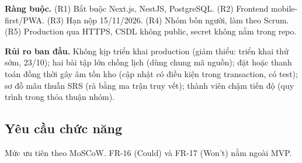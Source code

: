 \documentclass[a4paper]{article}
\begin{document}
\textbf{Ràng buộc.} (R1) Bắt buộc Next.js, NestJS, PostgreSQL. (R2) Frontend mobile-first/PWA. (R3) Hạn nộp 15/11/2026. (R4) Nhóm bốn người, làm theo Scrum. (R5) Production qua HTTPS, CSDL không public, secret không nằm trong repo.

\textbf{Rủi ro ban đầu.} Không kịp triển khai production (giảm thiểu: triển khai thử sớm, 23/10); hai bài tập lớn chồng lịch (dùng chung mã nguồn); đặt hoặc thanh toán đồng thời gây âm tồn kho (cập nhật có điều kiện trong transaction, có test); sơ đồ mâu thuẫn SRS (rà bằng ma trận truy vết); thành viên chậm tiến độ (quy trình trong thỏa thuận nhóm).

\subsection{Yêu cầu chức năng}\label{sec:se-fr}
Mức ưu tiên theo MoSCoW. FR-16 (Could) và FR-17 (Won't) nằm ngoài MVP.
\end{document}
